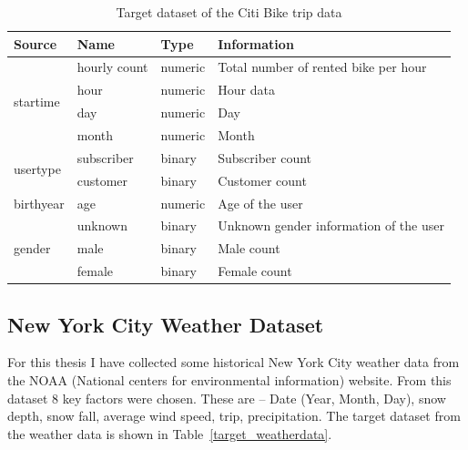 \begin{table}[]
\centering
\caption{Target dataset of the Citi Bike trip data}
\label{target_bikedata}
\begin{tabular}{||l||l|l|l||}
\hline
Source                    & Name         & Type             & Information                            \\\hline\hline
\multirow{4}{*}{startime} & hourly count & numeric          & Total number of rented bike per hour   \\ \cline{2-4} 
                          & hour         & numeric          & Hour data                              \\ \cline{2-4} 
                          & day          & numeric          & Day                                    \\ \cline{2-4} 
                          & month        & numeric          & Month                                  \\ \hline
\multirow{2}{*}{usertype} & subscriber    & binary & Subscriber count                       \\ \cline{2-4} 
                          & customer     & binary & Customer count                       \\ \hline
birthyear                 & age          & numeric          & Age of the user                        \\ \hline
\multirow{3}{*}{gender}   & unknown      & binary & Unknown gender information of the user \\ \cline{2-4} 
                          & male         & binary & Male count                             \\ \cline{2-4} 
                          & female       & binary & Female count                           \\ \hline
\end{tabular}
\end{table}


\subsection {New York City Weather Dataset}
\label{NYCweatherdata}

For this thesis I have collected some historical New York City weather data from the NOAA (National centers for environmental information) website. From this dataset 8 key factors were chosen. These are – Date (Year, Month, Day), snow depth, snow fall, average wind speed, trip, precipitation. The target dataset from the weather data is shown in Table~\ref{target_weatherdata}.

